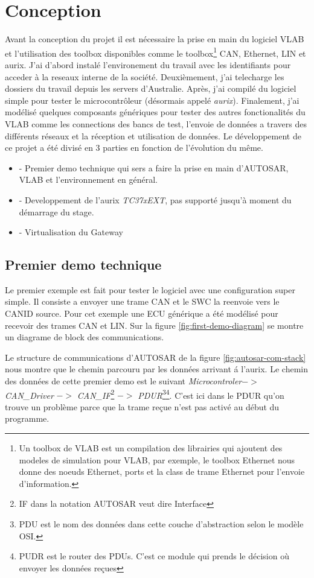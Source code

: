 \section{Conception}

Avant la conception du projet il est nécessaire la prise en main du logiciel VLAB et l'utilisation des toolbox disponibles comme le toolbox\footnote{Un toolbox de VLAB est un compilation des librairies qui ajoutent des modeles de simulation pour VLAB, par exemple, le toolbox Ethernet nous donne des noeuds Ethernet, ports et la class de trame Ethernet pour l'envoie d'information.} CAN, Ethernet, LIN et aurix. J'ai d'abord instal\'e l'environement du travail avec les identifiants pour acceder \`a la reseaux interne de la soci\'et\'e. Deuxièmement, j'ai telecharge les dossiers du travail depuis les servers d'Australie. Apr\`es, j'ai compil\'e du logiciel simple pour tester le microcontr\^oleur (désormais appel\'e \textit{aurix}). Finalement, j'ai mod\'elis\'e quelques composants génériques pour tester des autres fonctionalit\'es du VLAB comme les connections des bancs de test, l'envoie de donn\'ees a travers des différents réseaux et la réception et utilisation de donn\'ees. Le développement de ce projet a \'et\'e divis\'e en 3 parties en fonction de l'évolution du même.

\begin{itemize}
    \item - Premier demo technique qui sers a faire la prise en main d'AUTOSAR, VLAB et l'environnement en général.
    \item - Developpement de l'aurix \textit{TC37xEXT}\cite{aurix.tc37e}, pas support\'e jusqu'\`a moment du démarrage du stage.
    \item - Virtualisation du Gateway
\end{itemize}

\subsection{Premier demo technique}

Le premier exemple est fait pour tester le logiciel avec une configuration super simple. Il consiste a envoyer une trame CAN et le SWC la reenvoie vers le CANID source. Pour cet exemple une ECU générique a \'et\'e modélisé pour recevoir des trames CAN et LIN. Sur la figure \ref{fig:first-demo-diagram} se montre un diagrame de block des communications. 

Le structure de communications d'AUTOSAR de la figure \ref{fig:autosar-com-stack} nous montre que le chemin parcouru par les donn\'ees arrivant \'a l'aurix. Le chemin des donn\'ees de cette premier demo est le suivant \textit{Microcontroler}$ ->$ \textit{CAN\_Driver} $->$ \textit{CAN\_IF}\footnote{IF dans la notation AUTOSAR veut dire Interface} $->$ \textit{PDUR}\footnote{PDU est le nom des donn\'ees dans cette couche d'abstraction selon le mod\`ele OSI.}\footnote{PUDR\cite{pdu_r_man} est le router des PDUs. C'est ce module qui prends le décision o\`u envoyer les donn\'ees re\c cues}. C'est ici dans le PDUR qu'on trouve un probl\`eme parce que la trame re\c cue n'est pas activ\'e au début du programme.

